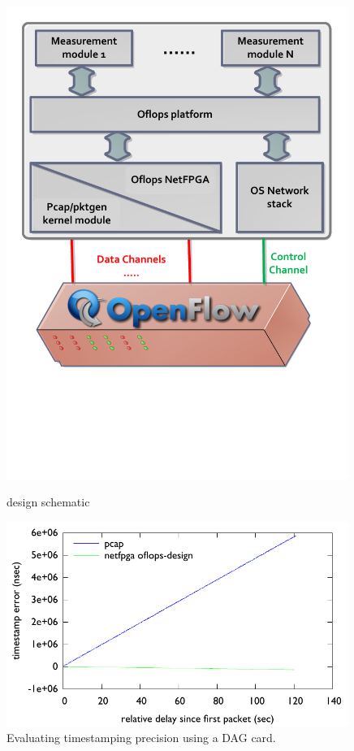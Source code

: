 \begin{figure}
\centering
\begin{minipage}[b]{0.49\linewidth}
\centering
 \includegraphics[width=0.99\textwidth]{openflow-design} 
\caption{\oflops design schematic}
\label{fig:oflops_design}
\end{minipage}
\begin{minipage}[b]{0.49\linewidth}
\centering
 \includegraphics[width=0.99\textwidth]{timer_precision} 
 \caption{Evaluating timestamping precision using a DAG card.}
\label{fig:timestamping}
\end{minipage}
\end{figure}

